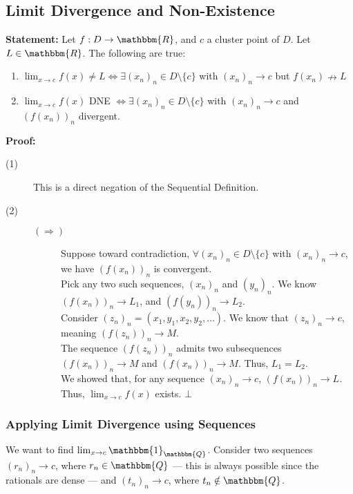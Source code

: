 \documentclass[10pt]{extarticle}
\newcommand{\Q}{\mathbbm{Q}}
\newcommand{\R}{\mathbbm{R}}
\begin{document}
  \subsection{Limit Divergence and Non-Existence}%
    \textbf{Statement:} Let $f: D\rightarrow \R$, and $c$ a cluster point of $D$. Let $L \in\R$. The following are true:
    \begin{enumerate}[(1)]
      \item $\lim_{x\rightarrow c}f(x) \neq L \Leftrightarrow \exists (x_n)_n \in D\setminus \{c\}$ with $(x_n)_n\rightarrow c$ but $f(x_n)\nrightarrow L$
      \item $\lim_{x\rightarrow c} f(x)$ DNE $\Leftrightarrow \exists (x_n)_n\in D\setminus\{c\}$ with $(x_n)_n \rightarrow c$ and $\left(f(x_n)\right)_n$ divergent.
    \end{enumerate}
    \textbf{Proof:}
    \begin{description}
      \item[(1)] This is a direct negation of the Sequential Definition.
      \item[(2)]\hfill
        \begin{description}
          \item[$(\Rightarrow)$] Suppose toward contradiction, $\forall (x_n)_n\in D\setminus \{c\}$ with $(x_n)_n \rightarrow c$, we have $\left(f(x_n)\right)_n$ is convergent.\\

            Pick any two such sequences, $(x_n)_n$ and $(y_n)_n$. We know $\left(f(x_n)\right)_n \rightarrow L_1$, and $\left(f(y_n)\right)_n \rightarrow L_2$.\\

            Consider $(z_n)_n = (x_1,y_1,x_2,y_2,\dots)$. We know that $(z_n)_n \rightarrow c$, meaning $\left(f(z_n)\right)_n \rightarrow M$.\\

            The sequence $\left(f(z_n)\right)_n$ admits two subsequences $\left(f(x_n)\right)_n \rightarrow M$ and $\left(f(x_n)\right)_n \rightarrow M$. Thus, $L_1 = L_2$.\\

            We showed that, for any sequence $\left(x_n\right)_n \rightarrow c$, $\left(f(x_n)\right)_n \rightarrow L$. Thus, $\lim_{x\rightarrow c}f(x)$ exists. $\bot$\\
        \end{description}
    \end{description}
    \subsubsection{Applying Limit Divergence using Sequences}%
    We want to find $\lim_{x\rightarrow c}\mathbbm{1}_{\Q}$. Consider two sequences $(r_n)_n \rightarrow c$, where $r_n \in \Q$ --- this is always possible since the rationals are dense --- and $(t_n)_n \rightarrow c$, where $t_n \notin \Q$.\\
\end{document}
